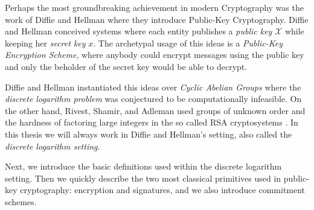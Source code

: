 Perhaps the most groundbreaking achievement in modern Cryptography was the work of Diffie and Hellman \cite{DifHel76} where they introduce Public-Key Cryptography. Diffie and Hellman conceived systems where each entity publishes a \emph{public key} $\mathcal{X}$ while keeping her \emph{secret key} $x$. The archetypal usage of this ideas is a \emph{Public-Key Encryption Scheme}, where anybody could encrypt messages using the public key and only the beholder of the secret key would be able to decrypt.

Diffie and Hellman instantiated this ideas over \emph{Cyclic Abelian Groups} where the \emph{discrete logarithm problem} was conjectured to be computationally infeasible. On the other hand, Rivest, Shamir, and Adleman used groups of unknown order and the hardness of factoring large integers in the so called RSA cryptosystems \cite{RivShaAdl78}.
In this thesis we will always work in Diffie and Hellman's setting, also called the \emph{discrete logarithm setting}.

Next, we introduce the basic definitions used within the discrete logarithm setting. Then we quickly describe the two most classical primitives used in public-key cryptography: encryption and signatures, and we also introduce commitment schemes.

